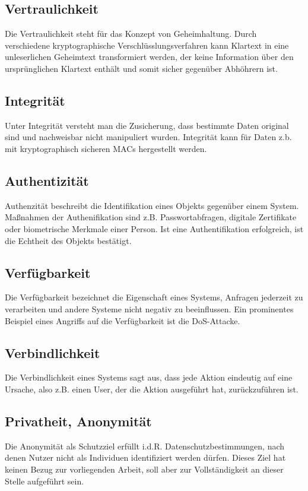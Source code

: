 \documentclass[../main.tex]{subfiles}
\begin{document}
    \subsection{Vertraulichkeit}
			Die Vertraulichkeit steht für das Konzept von Geheimhaltung. Durch verschiedene kryptographische Verschlüsslungsverfahren kann Klartext in eine unleserlichen Geheimtext transformiert werden, der keine Information über den ursprünglichen Klartext enthält und somit sicher gegenüber Abhöhrern ist.
    \subsection{Integrität}
			Unter Integrität versteht man die Zusicherung, dass bestimmte Daten original sind und nachweisbar nicht manipuliert wurden. Integrität kann für Daten z.b. mit kryptographisch sicheren MACs hergestellt werden.
		\subsection{Authentizität}
			Authenzität beschreibt die Identifikation eines Objekts gegenüber einem System. Maßnahmen der Authenifikation sind z.B. Passwortabfragen, digitale Zertifikate oder biometrische Merkmale einer Person. Ist eine Authentifikation erfolgreich, ist die Echtheit des Objekts bestätigt.
    \subsection{Verfügbarkeit}
			Die Verfügbarkeit bezeichnet die Eigenschaft eines Systems, Anfragen jederzeit zu verarbeiten und andere Systeme nicht negativ zu beeinflussen. Ein prominentes Beispiel eines Angriffs auf die Verfügbarkeit ist die \acrshort{DoS}-Attacke.
    \subsection{Verbindlichkeit}
			Die Verbindlichkeit eines Systems sagt aus, dass jede Aktion eindeutig auf eine Ursache, also z.B. einen User, der die Aktion ausgeführt hat, zurückzuführen ist.
		\subsection{Privatheit, Anonymität}
			Die Anonymität als Schutzziel erfüllt i.d.R. Datenschutzbestimmungen, nach denen Nutzer nicht als Individuen identifiziert werden dürfen. Dieses Ziel hat keinen Bezug zur vorliegenden Arbeit, soll aber zur Vollständigkeit an dieser Stelle aufgeführt sein.
\end{document}
